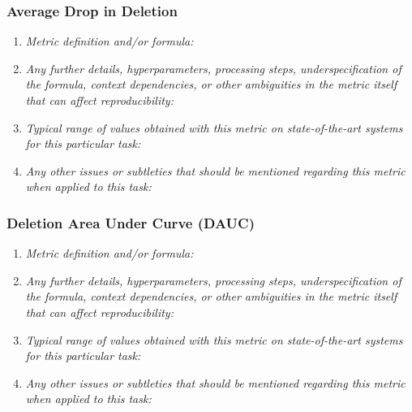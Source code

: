 \documentclass[a4paper,11pt]{article}
\begin{document}
        \subsubsection{Average Drop in Deletion}
            \begin{enumerate}[label=\alph*.]
                \item \textit{Metric definition and/or formula:}
                \bigskip
                \item \textit{Any further details, hyperparameters, processing steps, underspecification of the formula, context dependencies, or other ambiguities in the metric itself that can affect reproducibility:}
                \bigskip
                \item \textit{Typical range of values obtained with this metric on state-of-the-art systems for this particular task:}
                \bigskip
                \item \textit{Any other issues or subtleties that should be mentioned regarding this metric when applied to this task:}
                \bigskip
            \end{enumerate}
        \subsubsection{Deletion Area Under Curve (DAUC)}
            \begin{enumerate}[label=\alph*.]
                \item \textit{Metric definition and/or formula:}
                \bigskip
                \item \textit{Any further details, hyperparameters, processing steps, underspecification of the formula, context dependencies, or other ambiguities in the metric itself that can affect reproducibility:}
                \bigskip
                \item \textit{Typical range of values obtained with this metric on state-of-the-art systems for this particular task:}
                \bigskip
                \item \textit{Any other issues or subtleties that should be mentioned regarding this metric when applied to this task:}
                \bigskip
            \end{enumerate}
\end{document}
